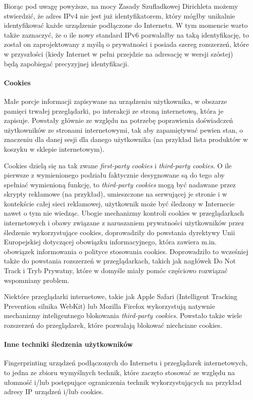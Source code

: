 Biorąc pod uwagę powyższe, na mocy Zasady Szufladkowej Dirichleta możemy
stwierdzić, że adres IPv4 nie jest już identyfikatorem, który mógłby unikalnie
identyfikować każde urządzenie podłączone do Internetu. W tym momencie warto
także zaznaczyć, że o ile nowy standard IPv6 pozwalałby na taką identyfikację,
to został on zaprojektowany z myślą o prywatności i posiada szereg rozszerzeń,
które w przyszłości (kiedy Internet w pełni przejdzie na adresację w wersji
szóstej) będą zapobiegać precyzyjnej identyfikacji.

\paragraph{Cookies}
Małe porcje informacji zapisywane na urządzeniu użytkownika, w obszarze pamięci
trwałej przeglądarki, po interakcji ze stroną internetową, która je zapisuje.
Powstały głównie ze względu na potrzebę poprawienia doświadczeń użytkowników ze
stronami internetowymi, tak aby zapamiętywać pewien stan, o znaczeniu dla danej
sesji dla danego użytkownika (na przykład lista produktów w koszyku w sklepie
internetowym).

Cookies dzielą się na tak zwane \emph{first-party cookies} i \emph{third-party
cookies}. O ile pierwsze z wymienionego podziału faktycznie desygnowane są do
tego aby spełniać wymienioną funkcję, to \emph{third-party cookies} mogą być
nadawane przez skrypty reklamowe (na przykład), umieszczone na serwującej je
stronie i w kontekście całej sieci reklamowej, użytkownik może być śledzony w
Internecie nawet o tym nie wiedząc. Ubogie mechanizmy kontroli cookies w
przeglądarkach internetowych i obawy związane z naruszaniem prywatności
użytkowników przez śledzenie wykorzystujące cookies, doprowadziły do powstania
dyrektywy Unii Europejskiej dotyczącej obowiązku informacyjnego, która zawiera
m.in. obowiązek informowania o polityce stosowania cookies. Doprowadziło to
wcześniej także do powstania rozszerzeń w przeglądarkach, takich jak nagłówek Do
Not Track i Tryb Prywatny, które w domyśle miały pomóc częściowo rozwiązać
wspomniany problem.

Niektóre przeglądarki internetowe, takie jak Apple Safari (Intelligent Tracking
Prevention silnika WebKit) lub Mozilla Firefox wykorzystują natywnie mechanizmy
inteligentnego blokowania \emph{third-party cookies}. Powstało także wiele
rozszerzeń do przeglądarek, które pozwalają blokować niechciane cookies.

\paragraph{Inne techniki śledzenia użytkowników}
Fingerprinting urządzeń podłączonych do Internetu i przeglądarek internetowych,
to jedna ze zbioru wymyślnych technik, które zaczęto stosować ze względu na
ułomność i/lub postępujące ograniczenia technik wykorzystujących na przykład
adresy IP urządzeń i/lub cookies.

